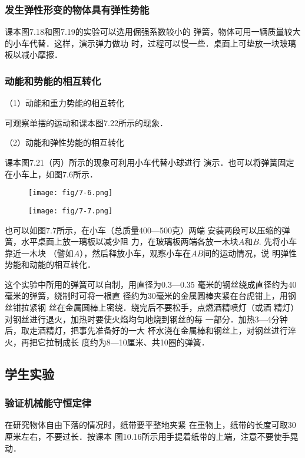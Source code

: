 \subsubsection{发生弹性形变的物体具有弹性势能}

课本图7.18和图7.19的实验可以选用倔强系数较小的
弹簧，物体可用一辆质量较大的小车代替．这样，演示弹力做功
时，过程可以慢一些．桌面上可垫放一块玻璃板以减小摩擦．


\subsubsection{动能和势能的相互转化}


（1）动能和重力势能的相互转化

可观察单摆的运动和课本图7.22所示的现象．

（2）动能和弹性势能的相互转化

课本图7.21（丙）所示的现象可利用小车代替小球进行
演示．也可以将弹簧固定在小车上，如图7.6所示．

\begin{figure}[htp]\centering
    \begin{minipage}[t]{0.48\textwidth}
    \centering
\texttt{[image: fig/7-6.png]}
    \caption{}
    \end{minipage}
    \begin{minipage}[t]{0.48\textwidth}
    \centering
\texttt{[image: fig/7-7.png]}
    \caption{}
    \end{minipage}
    \end{figure}

也可以如图7.7所示，在小车（总质量400—500克）两端
安装两段可以压缩的弹簧，水平桌面上放一璃板以减少阻
力，在玻璃板两端各放一木块$A$和$B$. 先将小车靠近一木块
（譬如$A$），然后释放小车，观察小车在$AB$间的运动情况，说
明弹性势能和动能的相互转化．

这个实验中所用的弹簧可以自制，用直径为0.3—0.35
毫米的钢丝绕成直径约为40毫米的弹簧，绕制时可将一根直
径约为30毫米的金属圆棒夹紧在台虎钳上，用钢丝钳拉紧钢
丝在金属圆棒上密绕．绕完后不要松手，点燃酒精喷灯（或酒
精灯）对钢丝进行退火，加热时要使火焰均匀地烧到钢丝的每
一部分．加热3—4分钟后，取走酒精灯，把事先准备好的一大
杯水浇在金属棒和钢丝上，对钢丝进行淬火，再把它拉制成长
度约为8—10厘米、共10圈的弹簧．

\subsection{学生实验}
\subsubsection{验证机械能守恒定律}
在研究物体自由下落的情况时，纸带要平整地夹紧
在重物上，纸带的长度可取30厘米左右，不要过长．按课本
图10.16所示用手提着纸带的上端，注意不要使手晃动．

